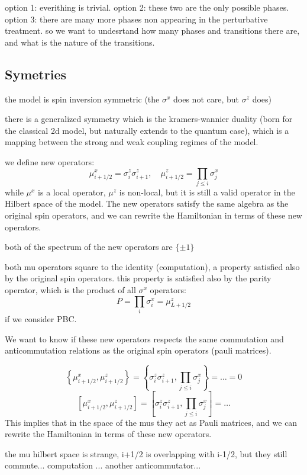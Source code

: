option 1: everithing is trivial.
option 2: these two are the only possible phases.
option 3: there are many more phases non appearing in the perturbative treatment.
so we want to undesrtand how many phases and transitions there are, and what is the nature of the transitions.

\subsection{Symetries}

the model is spin inversion symmetric (the \(\sigma^x\) does not care, but \(\sigma^z\) does)

there is a generalized symmetry which is the kramers-wannier duality (born for the classical 2d model, but naturally extends to the quantum case), which is a mapping between the strong and weak coupling regimes of the model.

we define new operators:
\[
    \mu^x_{i+1/2} = \sigma^z_i \sigma^z_{i+1}, \quad \mu^z_{i+1/2} = \prod_{j\leq i} \sigma^x_j
\]
while \(\mu^x\) is a local operator, \(\mu^z\) is non-local, but it is still a valid operator in the Hilbert space of the model. The new operators satisfy the same algebra as the original spin operators, and we can rewrite the Hamiltonian in terms of these new operators.

both of the spectrum of the new operators are \(\{\pm 1\}\)

both mu operators square to the identity (computation), a property satisfied also by the original spin operators.
this property is satisfied also by the parity operator, which is the product of all \(\sigma^x\) operators:
\[
    P = \prod_i \sigma^x_i = \mu^z_{L+1/2}
\]
if we consider PBC.

We want to know if these new operators respects the same commutation and anticommutation relations as the original spin operators (pauli matrices).

\[
    \left\{\mu^x_{i+1/2}, \mu^z_{i+1/2}\right\} = \left\{\sigma^z_i \sigma^z_{i+1}, \prod_{j\leq i} \sigma^x_j\right\} = \dots  = 0
\]
\[
    \left[ \mu^x_{i+1/2}, \mu^z_{i+1/2} \right] = \left[ \sigma^z_i \sigma^z_{i+1}, \prod_{j\leq i} \sigma^x_j \right] = \dots
\]
This implies that in the space of the mus they act as Pauli matrices, and we can rewrite the Hamiltonian in terms of these new operators.

the mu hilbert space is strange, i+1/2 is overlapping with i-1/2, but they still commute... computation ... another anticommutator...

